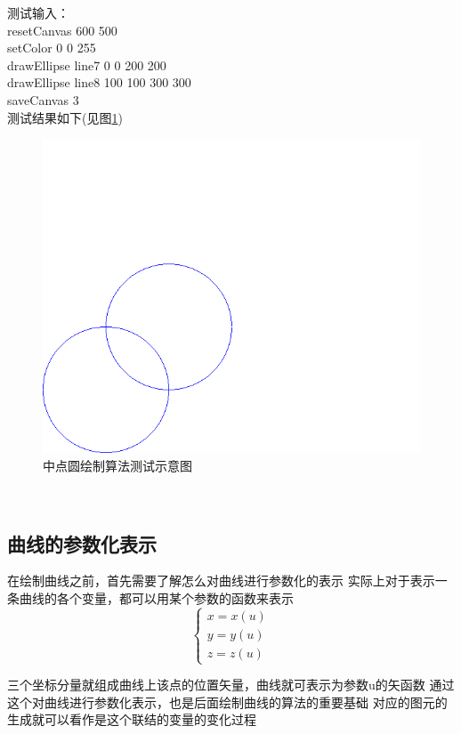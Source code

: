 \documentclass[a4paper,UTF8]{article}
\theoremstyle{definition}
\begin{document}
测试输入：\\
\indent resetCanvas 600 500\\
\indent setColor 0 0 255\\
\indent drawEllipse line7 0 0 200 200\\
\indent drawEllipse line8 100 100 300 300\\
\indent saveCanvas 3\\
测试结果如下(见图\ref{fig:circletest})
\begin{figure}[h]
	\centering
	\includegraphics[scale=0.3]{figure/circletest.png}
	\caption{中点圆绘制算法测试示意图}
	\label{fig:circletest}
\end{figure}\\


\subsection{曲线的参数化表示}
在绘制曲线之前，首先需要了解怎么对曲线进行参数化的表示
实际上对于表示一条曲线的各个变量，都可以用某个参数的函数来表示
$$
\begin{cases}
    x=x(u)\\
    y=y(u)\\
    z=z(u)
\end{cases}
$$

三个坐标分量就组成曲线上该点的位置矢量，曲线就可表示为参数u的矢函数
通过这个对曲线进行参数化表示，也是后面绘制曲线的算法的重要基础
对应的图元的生成就可以看作是这个联结的变量的变化过程
\end{document}

